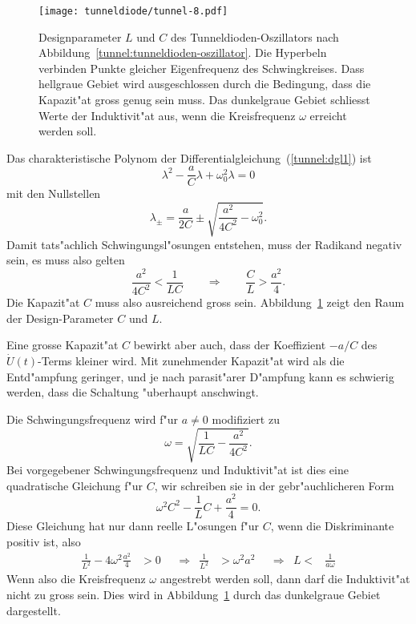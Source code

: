 \begin{figure}
\centering
\texttt{[image: tunneldiode/tunnel-8.pdf]}
\caption{Designparameter $L$ und $C$ des Tunneldioden-Oszillators nach
Abbildung~\ref{tunnel:tunneldioden-oszillator}. 
Die Hyperbeln verbinden Punkte gleicher Eigenfrequenz des Schwingkreises.
Dass hellgraue Gebiet wird ausgeschlossen durch die Bedingung, dass die
Kapazit"at gross genug sein muss.
Das dunkelgraue Gebiet schliesst Werte der Induktivit"at aus, wenn die
Kreisfrequenz $\omega$ erreicht werden soll.
\label{tunnel:designparameter}}
\end{figure}

Das charakteristische Polynom der Differentialgleichung~(\ref{tunnel:dgl1})
ist
\[
\lambda^2-\frac{a}{C}\lambda +\omega_0^2\lambda=0
\]
mit den Nullstellen
\[
\lambda_\pm = \frac{a}{2C}\pm\sqrt{\frac{a^2}{4C^2}-\omega_0^2}.
\]
Damit tats"achlich Schwingungsl"osungen entstehen, muss der Radikand
negativ sein, es muss also gelten
\[
\frac{a^2}{4C^2}<\frac1{LC}
\qquad\Rightarrow\qquad
\frac{C}{L} > \frac{a^2}{4}.
\]
Die Kapazit"at $C$ muss also ausreichend gross sein.
Abbildung~\ref{tunnel:designparameter} zeigt den Raum der Design-Parameter
$C$ und $L$.

Eine grosse Kapazit"at $C$ bewirkt aber auch, dass der Koeffizient
$-a/C$ des $\dot U(t)$-Terms kleiner wird. Mit zunehmender Kapazit"at
wird als die Entd"ampfung geringer, und je nach parasit"arer D"ampfung
kann es schwierig werden, dass die Schaltung "uberhaupt anschwingt.

Die Schwingungsfrequenz wird f"ur $a\ne 0$ modifiziert zu
\begin{equation}
\omega
=
\sqrt{
\frac{1}{LC}
-
\frac{a^2}{4C^2}
}.
\label{tunnel:oszillatorfrequenz}
\end{equation}
Bei vorgegebener Schwingungsfrequenz und Induktivit"at ist dies eine
quadratische Gleichung f"ur $C$, wir schreiben sie in der gebr"auchlicheren
Form
\[
\omega^2 C^2 -\frac1{L}C+\frac{a^2}{4}=0.
\]
Diese Gleichung hat nur dann reelle L"osungen f"ur $C$, wenn die Diskriminante
positiv ist, also
\begin{equation}
\begin{aligned}
\frac1{L^2}-4\omega^2\frac{a^2}4&>0
&
&\Rightarrow&
\frac1{L^2}&>\omega^2a^2
&
&\Rightarrow&
L<&\frac1{a\omega}
\end{aligned}
\end{equation}
Wenn also die Kreisfrequenz $\omega$ angestrebt werden soll, dann darf die
Induktivit"at nicht zu gross sein.
Dies wird in Abbildung~\ref{tunnel:designparameter} durch das dunkelgraue
Gebiet dargestellt.


